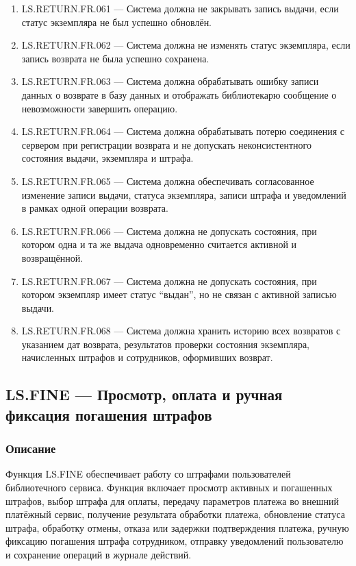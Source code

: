 \documentclass[12pt,a4paper]{article}
\begin{document}
\begin{enumerate}
		\item LS.RETURN.FR.061 --- Система должна не закрывать запись выдачи, если статус
		экземпляра не был успешно обновлён.
		
		\item LS.RETURN.FR.062 --- Система должна не изменять статус экземпляра, если
		запись возврата не была успешно сохранена.
		
		\item LS.RETURN.FR.063 --- Система должна обрабатывать ошибку записи данных
		о возврате в базу данных и отображать библиотекарю сообщение о невозможности
		завершить операцию.
		
		\item LS.RETURN.FR.064 --- Система должна обрабатывать потерю соединения с сервером
		при регистрации возврата и не допускать неконсистентного состояния выдачи,
		экземпляра и штрафа.
		
		\item LS.RETURN.FR.065 --- Система должна обеспечивать согласованное изменение
		записи выдачи, статуса экземпляра, записи штрафа и уведомлений в рамках одной
		операции возврата.
		
		\item LS.RETURN.FR.066 --- Система должна не допускать состояния, при котором
		одна и та же выдача одновременно считается активной и возвращённой.
		
		\item LS.RETURN.FR.067 --- Система должна не допускать состояния, при котором
		экземпляр имеет статус ``выдан'', но не связан с активной записью выдачи.
		
		\item LS.RETURN.FR.068 --- Система должна хранить историю всех возвратов с указанием
		дат возврата, результатов проверки состояния экземпляра, начисленных штрафов
		и сотрудников, оформивших возврат.
	\end{enumerate}
	
	\subsection{LS.FINE --- Просмотр, оплата и ручная фиксация погашения штрафов}
	
	\subsubsection{Описание}
	
	Функция LS.FINE обеспечивает работу со штрафами пользователей библиотечного
	сервиса. Функция включает просмотр активных и погашенных штрафов, выбор
	штрафа для оплаты, передачу параметров платежа во внешний платёжный сервис,
	получение результата обработки платежа, обновление статуса штрафа, обработку
	отмены, отказа или задержки подтверждения платежа, ручную фиксацию погашения
	штрафа сотрудником, отправку уведомлений пользователю и сохранение операций
	в журнале действий.
	
\end{document}
